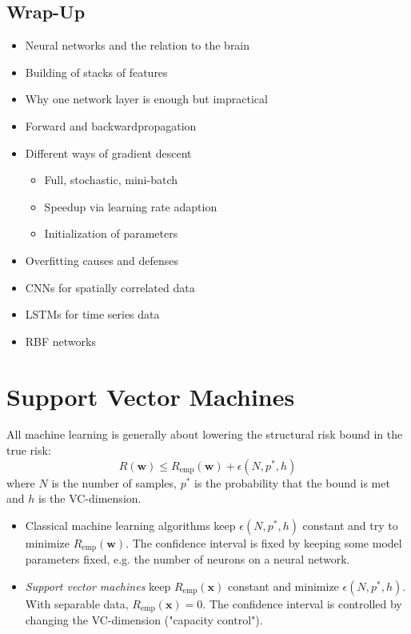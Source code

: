 \documentclass[a4paper, 11pt, accentcolor = tud3b]{tudreport}
\newcommand{\emp}{\textrm{emp}}
\renewcommand{\vec}[1]{\mathbf{#1}}
\begin{document}
		\section{Wrap-Up}
			\begin{itemize}
				\item Neural networks and the relation to the brain
				\item Building of stacks of features
				\item Why one network layer is enough but impractical
				\item Forward and backwardpropagation
				\item Different ways of gradient descent
					\begin{itemize}
						\item Full, stochastic, mini-batch
						\item Speedup via learning rate adaption
						\item Initialization of parameters
					\end{itemize}
				\item Overfitting causes and defenses
				\item CNNs for spatially correlated data
				\item LSTMs for time series data
				\item RBF networks
			\end{itemize}

	\chapter{Support Vector Machines}
		All machine learning is generally about lowering the structural risk bound in the true risk:
		\begin{equation}
			R(\vec{w}) \leq R_\emp(\vec{w}) + \epsilon(N, p^\ast, h)
		\end{equation}
		where \( N \) is the number of samples, \(p^\ast\) is the probability that the bound is met and \(h\) is the VC-dimension.
		
		\begin{itemize}
			\item Classical machine learning algorithms keep \( \epsilon(N, p^\ast, h) \) constant and try to minimize \( R_\emp(\vec{w}) \). The confidence interval is fixed by keeping some model parameters fixed, e.g. the number of neurons on a neural network.
			\item \emph{Support vector machines} keep \(R_\emp(\vec{x})\) constant and minimize \( \epsilon(N, p^\ast, h) \). With separable data, \( R_\emp(\vec{x}) = 0 \). The confidence interval is controlled by changing the VC-dimension ("capacity control").
		\end{itemize}
\end{document}

